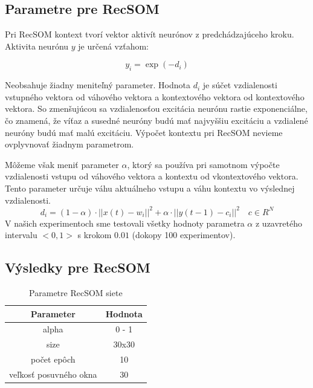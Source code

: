 \subsection{Parametre pre RecSOM}
Pri RecSOM kontext tvorí vektor aktivít neurónov z predchádzajúceho kroku.
Aktivita neurónu $y$ je určená vzťahom:

\begin{equation}
    y_{i} = \exp{(-d_{i})}
\end{equation}

Neobsahuje žiadny meniteľný parameter. Hodnota $d_{i}$ je súčet vzdialenosti vstupného vektora od váhového vektora a kontextového vektora od 
kontextového vektora. So zmenšujúcou sa vzdialenosťou excitácia neurónu rastie exponenciálne, čo 
znamená, že víťaz a susedné neuróny budú mať najvyššiu excitáciu a vzdialené neuróny budú mať malú excitáciu.
Výpočet kontextu pri RecSOM nevieme ovplyvnovať žiadnym parametrom.

Môžeme však meniť parameter $\alpha$, ktorý sa používa pri samotnom výpočte vzdialenosti
vstupu od váhového vektora a kontextu od vkontextového vektora. Tento parameter určuje váhu aktuálneho vstupu a váhu kontextu
vo výslednej vzdialenosti.
\begin{equation}
	d_i = (1 - \alpha) \cdot ||x(t) - w_i||^{2} + \alpha \cdot ||y(t-1) - c_i||^{2} \quad c \in R^{N}
\end{equation}
V našich experimentoch sme testovali všetky hodnoty parametra $\alpha$ z uzavretého intervalu
$<0, 1>$ s krokom $0.01$ (dokopy 100 experimentov).

\subsection{Výsledky pre RecSOM}

\begin{table}[h!]
    \centering
    \begin{tabular}{|c|c|} 
     \hline
     Parameter & Hodnota \\ 
     \hline\hline
     alpha & 0 - 1  \\ 
     \hline
     size & 30x30  \\
     \hline
     počet epôch & 10  \\
     \hline
     veľkosť posuvného okna & 30  \\
     \hline
    \end{tabular}
    \caption{Parametre RecSOM siete}
    \label{table:1}
    \end{table}
    

